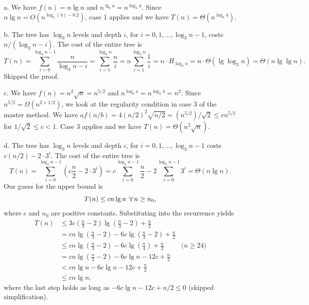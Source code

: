 \begin{enumerate}
\begin{framed}
  \begin{enumerate}
    \item[a.] We have $f(n) = n \lg n$ and $n^{\lg_b a} = n^{\log_3 4}$.
      Since $n \lg n = O(n^{\log_3(4) - 0.2})$, case 1 applies and we have
      $T(n) = \Theta(n^{\log_3 4})$.
    \item[b.] The tree has $\log_3 n$ levels and depth $i$, for $i = 0, 1,
      \dots, \log_3 n - 1$, costs $n/(\log_3 n - i)$. The cost of the entire
      tree is
      \[
        T(n) = \sum_{i = 0}^{\log_3 n - 1} \frac{n}{\log_3 n - i}
             = \sum_{i = 1}^{\log_3 n} \frac{n}{i}
             = n \sum_{i = 1}^{\log_3 n} \frac{1}{i}
             = n \cdot H_{\log_3 n}
             = n \cdot \Theta(\lg \log_3 n)
             = \Theta(n \lg \lg n).
      \]
      Skipped the proof.
    \item[c.] We have $f(n) = n^2 \sqrt n = n^{5/2}$ and
      $n^{\log_b a} = n^{\log_2 4} = n^2$. Since
      $n^{5/2} = \Omega(n^{2 + 1/2})$, we look at the regularity condition in
      case 3 of the master method. We have
      $af(n/b) = 4(n/2)^2 \sqrt{n/2} = (n^{5/2})/\sqrt 2 \le c n^{5/2}$ for
      $1/\sqrt 2 \le c < 1$. Case 3 applies and we have
      $T(n) = \Theta(n^2 \sqrt n)$.
    \item[d.]
      The tree has $\log_3 n$ levels and depth $i$, for
      $i = 0, 1, \dots, \log_3 n - 1$ costs $c (n/2) - 2 \cdot 3^i$. The cost of
      the entire tree is
      \[
        T(n) = \sum_{i = 0}^{\log_3 n - 1} \left(c \frac{n}{2} - 2 \cdot 3^i\right)
             = c \sum_{i = 0}^{\log_3 n - 1} \frac{n}{2} - 2 \sum_{i = 0}^{\log_3 n - 1} 3^i
             = \Theta(n \lg n).
      \]
      Our guess for the upper bound is
      \[
      T(n) \le c n \lg n \; \operatorname{\forall} n \ge n_0,
      \]
      where $c$ and $n_0$ are positive constants. Substituting into the recurrence
      yields
      \begin{equation*}
      \begin{aligned}
        T(n) &\le 3c \left(\frac{n}{3} - 2\right) \lg \left(\frac{n}{3} - 2\right) + \frac{n}{2}\\
             &=   c n \lg \left(\frac{n}{3} - 2\right) - 6c \lg \left(\frac{n}{3} - 2\right) + \frac{n}{2}\\
             &\le cn \lg \left(\frac{n}{3} - 2\right) - 6c \lg \left(\frac{n}{4}\right) + \frac{n}{2} & \text{($n \ge 24$)}\\
             &=   cn \lg \left(\frac{n}{3} - 2\right) - 6c \lg n - 12 c + \frac{n}{2}\\
             &<   cn \lg n - 6c \lg n - 12c + \frac{n}{2}\\
             &\le cn \lg n,
      \end{aligned}
      \end{equation*}
      where the last step holds as long as $-6c \lg n - 12c + n/2 \le 0$
      (skipped simplification).


\end{enumerate}
\end{framed}
\end{enumerate}
